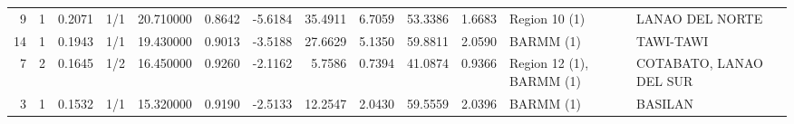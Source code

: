 \begin{tabular}{rrrlrrrrrrrll}
9 & 1 & {\cellcolor[HTML]{7A9DF8}} \color[HTML]{F1F1F1} 0.2071 & 1/1 & {\cellcolor[HTML]{7A9DF8}} \color[HTML]{F1F1F1} 20.710000 & 0.8642 & -5.6184 & 35.4911 & 6.7059 & 53.3386 & 1.6683 & Region 10 (1) & LANAO DEL NORTE \\
14 & 1 & {\cellcolor[HTML]{6A8BEF}} \color[HTML]{F1F1F1} 0.1943 & 1/1 & {\cellcolor[HTML]{6A8BEF}} \color[HTML]{F1F1F1} 19.430000 & 0.9013 & -3.5188 & 27.6629 & 5.1350 & 59.8811 & 2.0590 & BARMM (1) & TAWI-TAWI \\
7 & 2 & {\cellcolor[HTML]{465ECF}} \color[HTML]{F1F1F1} 0.1645 & 1/2 & {\cellcolor[HTML]{465ECF}} \color[HTML]{F1F1F1} 16.450000 & 0.9260 & -2.1162 & 5.7586 & 0.7394 & 41.0874 & 0.9366 & Region 12 (1), BARMM (1) & COTABATO, LANAO DEL SUR \\
3 & 1 & {\cellcolor[HTML]{3B4CC0}} \color[HTML]{F1F1F1} 0.1532 & 1/1 & {\cellcolor[HTML]{3B4CC0}} \color[HTML]{F1F1F1} 15.320000 & 0.9190 & -2.5133 & 12.2547 & 2.0430 & 59.5559 & 2.0396 & BARMM (1) & BASILAN \\
\bottomrule
\end{tabular}
